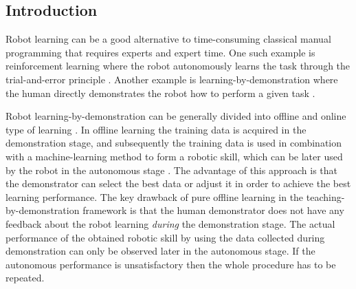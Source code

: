 


\subsection{Introduction}
\label{sec:introduction}
Robot learning can be a good alternative to time-consuming classical manual programming that requires experts and expert time. One such example is reinforcement learning where the robot autonomously learns the task through the trial-and-error principle \cite{Kober2012}. Another example is learning-by-demonstration where the human directly demonstrates the robot how to perform a given task \cite{Hersch2008,Evrard2009,Ude2010,Amor2009,Nguyen2009,Peternel2013b,Gams2009,Peternel2014}.

Robot learning-by-demonstration can be generally divided into offline and online type of learning \cite{Nguyen2011}. In offline learning the training data is acquired in the demonstration stage, and subsequently the training data is used in combination with a machine-learning method to form a robotic skill, which can be later used by the robot in the autonomous stage \cite{Hersch2008,Evrard2009,Ude2010,Ewerton2015}. The advantage of this approach is that the demonstrator can select the best data or adjust it in order to achieve the best learning performance. The key drawback of pure offline learning in the teaching-by-demonstration framework is that the human demonstrator does not have any feedback about the robot learning {\it during} the demonstration stage. The actual performance of the obtained robotic skill by using the data collected during demonstration can only be observed later in the autonomous stage. If the autonomous performance is unsatisfactory then the whole procedure has to be repeated.

